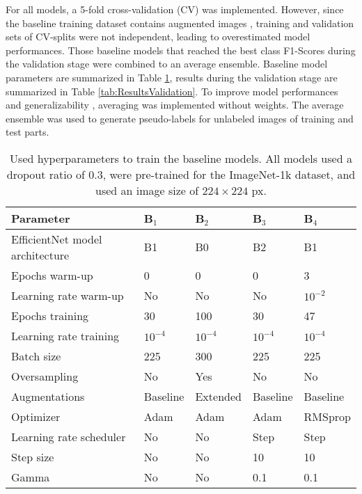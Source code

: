\documentclass[runningheads]{llncs}
\begin{document}
For all models, a 5-fold cross-validation (CV) was implemented. However, since the baseline training dataset contains augmented images \cite{10.1109/BHI50953.2021.9508563}, training and validation sets of CV-splits were not independent, leading to overestimated model performances. Those baseline models that reached the best class F1-Scores during the validation stage were combined to an average ensemble. Baseline model parameters are summarized in Table \ref{tab:classificationparameters}, results during the validation stage are summarized in Table \ref{tab:ResultsValidation}. To improve model performances and generalizability \cite{Krizhevsky2012}, averaging was implemented without weights. The average ensemble was used to generate pseudo-labels for unlabeled images of training and test parts.

\begin{table}[ht!]
	\begin{center}
		\caption{Used hyperparameters to train the baseline models. All models used a dropout ratio of 0.3, were pre-trained for the ImageNet-1k dataset, and used an image size of $224 \times 224$ px.}\label{tab:classificationparameters}
			\begin{tabularx}{\textwidth}{|l|X|X|X|X|}
			\hline
			\textbf{Parameter} & \textbf{B$_1$} & \textbf{B$_2$} & \textbf{B$_3$} & \textbf{B$_4$}\\
			\hline
			\hline	
		EfficientNet model architecture & B1 & B0&B2 & B1\\
			Epochs warm-up & 0 & 0 & 0 & 3\\
			Learning rate warm-up & No & No & No & $10^{-2}$ \\
			Epochs training & 30 & 100 & 30 & 47 \\
			Learning rate training & $10^{-4}$ & $10^{-4}$ & $10^{-4}$ & $10^{-4}$ \\
			Batch size & 225 & 300 & 225 & 225\\
			Oversampling & No & Yes & No & No \\
			Augmentations & Baseline&Extended&Baseline&Baseline\\
			\hline
			Optimizer & Adam & Adam & Adam & RMSprop\\
			\hline
			Learning rate scheduler & No & No & Step & Step \\
			Step size & No & No & 10 & 10 \\
			Gamma & No & No & 0.1 & 0.1\\
			\hline
		\end{tabularx}		
	\end{center}
\end{table}
\end{document}
